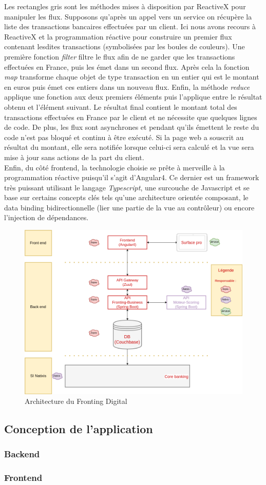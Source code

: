 	Les rectangles gris sont les méthodes mises à disposition par ReactiveX pour manipuler les flux. Supposons qu'après un appel vers un service on récupère la liste des transactions bancaires effectuées par un client. Ici nous avons recours à ReactiveX et la programmation réactive pour construire un premier flux contenant lesdites transactions (symbolisées par les boules de couleurs). Une première fonction \textit{filter} filtre le flux afin de ne garder que les transactions effectuées en France, puis les émet dans un second flux. Après cela la fonction \textit{map} transforme chaque objet de type transaction en un entier qui est le montant en euros puis émet ces entiers dans un nouveau flux. Enfin, la méthode \textit{reduce} applique une fonction aux deux premiers éléments puis l'applique entre le résultat obtenu et l'élément suivant. Le résultat final contient le montant total des transactions effectuées en France par le client et ne nécessite que quelques lignes de code. De plus, les flux sont asynchrones et pendant qu'ils émettent le reste du code n'est pas bloqué et continu à être exécuté. Si la page web a souscrit au résultat du montant, elle sera notifiée lorsque celui-ci sera calculé et la vue sera mise à jour sans actions de la part du client. \\

	Enfin, du côté frontend, la technologie choisie se prête à merveille à la programmation réactive puisqu'il s'agit d'Angular4. Ce dernier est un framework très puissant utilisant le langage \textit{Typescript}, une surcouche de Javascript et se base sur certains concepts clés tels qu'une architecture orientée composant, le data binding bidirectionnelle (lier une partie de la vue au contrôleur) ou encore l'injection de dépendances.

\begin{figure}[h!]
	\includegraphics[scale=0.50]{images/travailBP1818/architecture/archiFonc.png}
	\centering
	\caption{Architecture du Fronting Digital}
	\label{archiFoncBP1818}
\end{figure}

\subsection{Conception de l'application}

\subsubsection{Backend}
\subsubsection{Frontend}